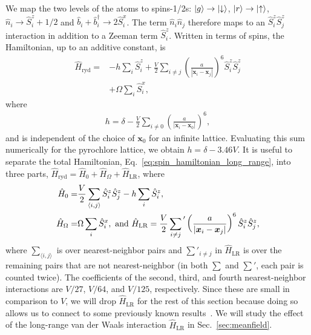 \documentclass[twocolumn,superscriptaddress,amsmath,amssymb,aps,prx,nofootinbib]{revtex4-2}
\newcommand{\sumlr}[1]{\sum^{}_{#1} {\vphantom{\sum}}'}
\begin{document}
We map the two levels of the atoms to spins-1/2s: $\ket{g} \rightarrow \ket{\downarrow}$, $\ket{r} \rightarrow \ket{\uparrow}$, $\hat{n}_i \rightarrow \hat{S}_i^z +1/2$  and $\hat{b}_i + \hat{b}_i^\dagger \rightarrow 2 \hat{S}_i^x$. The term $\hat{n}_i \hat{n}_j$ therefore maps to an $ \hat{S}_i^z \hat{S}_j^z$ interaction in addition to a Zeeman term $\hat{S}_i^z$. Written in terms of spins, the Hamiltonian, up to an additive constant, is
\begin{equation} \label{eq:spin_hamiltonian_long_range}
\begin{aligned}
\hat{H}_{\text{ryd}} = &- h \sum_i \hat{S}_i^z + \frac{V}{2} \sum_{i \neq j} \left( \frac{a}{|\bm{x}_i - \bm{x}_j| }\right)^6 \hat{S}_i^z \hat{S}_j^z  \\
& + \Omega \sum_i \hat{S}_i^x ,
\end{aligned}
\end{equation}
where
\begin{equation} \label{eq:h_def}
\begin{aligned}
  h = \delta -\frac{V}{2}   \sum^{}_{i \neq 0}  \left( \frac{a}{|\bm{x}_i - \bm{x}_0|} \right)^6, 
  \end{aligned}
\end{equation}
and is independent of the choice of $\bm{x}_0$ for an infinite lattice.
Evaluating this sum numerically for the pyrochlore lattice, we obtain  $h = \delta - 3.46 V$. It is useful to separate the total Hamiltonian, Eq.~\eqref{eq:spin_hamiltonian_long_range}, into three parts, $\hat{H}_{\text{ryd}}=\hat{H}_0 + \hat{H}_{\Omega}+\hat{H}_{\text{LR}}$, where
\begin{equation}\label{eq:hamsplit}
    \begin{aligned}
      \hat{H}_0=& \frac{V}{2}\sum_{\langle i,j \rangle }\hat{S}_i^z \hat{S}_j^z - h \sum_i \hat{S}_i^z,\\
        \hat{H}_{\Omega}=&\Omega \sum_i \hat{S}_i^x, \text{ and }
        \hat{H}_{\text{LR}}= \frac{V}{2} \sumlr{i \neq j} \left( \frac{a}{|\bm{x}_i - \bm{x}_j| }\right)^6 \hat{S}_i^z \hat{S}_j^z,  
    \end{aligned}
\end{equation}
where $\sum_{\langle i,j \rangle }$ is over nearest-neighbor pairs and $\sum'_{i \neq j}$ in $\hat{H}_{\text{LR}}$ is over the remaining pairs that are not nearest-neighbor (in both $\sum$ and $\sum'$, each pair is counted twice). The coefficients of the second, third, and fourth nearest-neighbor interactions are $V/27$, $V/64$, and $V/125$, respectively. Since these are small in comparison to $V$, we will drop $\hat{H}_{\text{LR}}$ for the rest of this section because doing so allows us to connect to some previously known results~\cite{hermele2004,shannon2012,Sikora2009}. We will study the effect of the long-range van der Waals interaction $\hat{H}_{\text{LR}}$ in Sec.~\ref{sec:meanfield}. 
\end{document}
